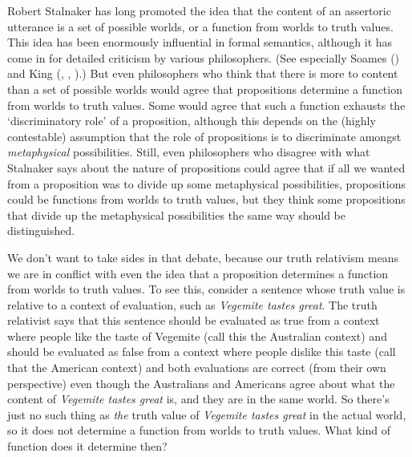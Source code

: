 \documentclass[
  11pt,
  letterpaper,
  DIV=11,
  numbers=noendperiod,
  twoside]{scrartcl}
\begin{document}
Robert Stalnaker has long promoted the idea that the content of an
assertoric utterance is a set of possible worlds, or a function from
worlds to truth values. This idea has been enormously influential in
formal semantics, although it has come in for detailed criticism by
various philosophers. (See especially Soames
() and King
(, ,
).) But even philosophers who think that
there is more to content than a set of possible worlds would agree that
propositions determine a function from worlds to truth values. Some
would agree that such a function exhausts the `discriminatory role' of a
proposition, although this depends on the (highly contestable)
assumption that the role of propositions is to discriminate amongst
\emph{metaphysical} possibilities. Still, even philosophers who disagree
with what Stalnaker says about the nature of propositions could agree
that if all we wanted from a proposition was to divide up some
metaphysical possibilities, propositions could be functions from worlds
to truth values, but they think some propositions that divide up the
metaphysical possibilities the same way should be distinguished.

We don't want to take sides in that debate, because our truth relativism
means we are in conflict with even the idea that a proposition
determines a function from worlds to truth values. To see this, consider
a sentence whose truth value is relative to a context of evaluation,
such as \emph{Vegemite tastes great}. The truth relativist says that
this sentence should be evaluated as true from a context where people
like the taste of Vegemite (call this the Australian context) and should
be evaluated as false from a context where people dislike this taste
(call that the American context) and both evaluations are correct (from
their own perspective) even though the Australians and Americans agree
about what the content of \emph{Vegemite tastes great} is, and they are
in the same world. So there's just no such thing as \emph{the} truth
value of \emph{Vegemite tastes great} in the actual world, so it does
not determine a function from worlds to truth values. What kind of
function does it determine then?
\end{document}
